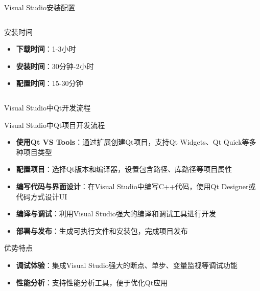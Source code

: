 \documentclass[UTF8,aspectratio=169]{beamer}
\begin{document}
\begin{frame}{Visual Studio安装配置}
\begin{columns}
\begin{column}{0.4\textwidth}
            \begin{ytublock}{安装时间}
                \begin{itemize}
                    \item \textbf{下载时间}：1-3小时
                    \item \textbf{安装时间}：30分钟-2小时
                    \item \textbf{配置时间}：15-30分钟
                \end{itemize}
            \end{ytublock}
        \end{column}
    \end{columns}
\end{frame}

\begin{frame}{Visual Studio中Qt开发流程}
    \begin{ytublock}{Visual Studio中Qt项目开发流程}
        \begin{itemize}
            \item \textbf{使用Qt VS Tools}：通过扩展创建Qt项目，支持Qt Widgets、Qt Quick等多种项目类型
            \item \textbf{配置项目}：选择Qt版本和编译器，设置包含路径、库路径等项目属性
            \item \textbf{编写代码与界面设计}：在Visual Studio中编写C++代码，使用Qt Designer或代码方式设计UI
            \item \textbf{编译与调试}：利用Visual Studio强大的编译和调试工具进行开发
            \item \textbf{部署与发布}：生成可执行文件和安装包，完成项目发布
        \end{itemize}
    \end{ytublock}

    \begin{ytublock}{优势特点}
        \begin{itemize}
            \item \textbf{调试体验}：集成Visual Studio强大的断点、单步、变量监视等调试功能
            \item \textbf{性能分析}：支持性能分析工具，便于优化Qt应用
        \end{itemize}
    \end{ytublock}
\end{frame}
\end{document}
